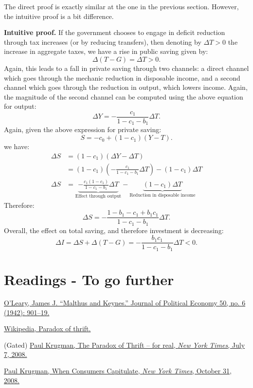 \documentclass[]{book}
\begin{document}
The direct proof is exactly similar at the one in the previous section.
However, the intuitive proof is a bit difference.

\textbf{Intuitive proof.} If the government chooses to engage in deficit
reduction through tax increases (or by reducing transfers), then
denoting by \(\Delta T>0\) the increase in aggregate taxes, we have a
rise in public saving given by: \[\Delta(T-G)=\Delta T>0.\] Again, this
leads to a fall in private saving through two channels: a direct channel
which goes through the mechanic reduction in disposable income, and a
second channel which goes through the reduction in output, which lowers
income. Again, the magnitude of the second channel can be computed using
the above equation for output:
\[\Delta Y=-\frac{c_{1}}{1-c_{1}-b_{1}}\Delta T.\] Again, given the
above expression for private saving:
\[S=-c_{0}+\left(1-c_{1}\right)\left(Y-T\right).\] we have: \[
\begin{aligned}
\Delta S    &=(1-c_{1})(\Delta Y-\Delta T)\\
    &=(1-c_{1})\left(-\frac{c_{1}}{1-c_{1}-b_{1}}\Delta T\right)-(1-c_{1})\Delta T\\
\Delta S    &=\underbrace{-\frac{c_{1}(1-c_{1})}{1-c_{1}-b_{1}}\Delta T}_{\text{Effect through output}}-\underbrace{(1-c_{1})\Delta T}_{\text{Reduction in disposable income}}
\end{aligned}
\] Therefore:
\[\Delta S=-\frac{1-b_{1}-c_{1}+b_{1}c_{1}}{1-c_{1}-b_{1}}\Delta T.\]
Overall, the effect on total saving, and therefore investment is
decreasing:
\[\Delta I  =\Delta S+\Delta(T-G)=-\frac{b_{1}c_{1}}{1-c_{1}-b_{1}}\Delta T<0.\]

\section*{Readings - To go further}\label{readings---to-go-further-7}

\href{https://www.jstor.org/stable/1826621}{O'Leary, James J. ``Malthus
and Keynes.'' Journal of Political Economy 50, no. 6 (1942): 901--19.}

\href{https://en.wikipedia.org/wiki/Paradox_of_thrift}{Wikipedia,
Paradox of thrift.}

(Gated)
\href{https://krugman.blogs.nytimes.com/2009/07/07/the-paradox-of-thrift-for-real/}{Paul
Krugman, The Paradox of Thrift -- for real, \emph{New York Times}, July
7, 2008.}

\href{https://search.proquest.com/nytimes/docview/433945040/E76AA2F8F9C14A34PQ/2?accountid=14512}{Paul
Krugman, When Consumers Capitulate, \emph{New York Times}, October 31,
2008.}
\end{document}
